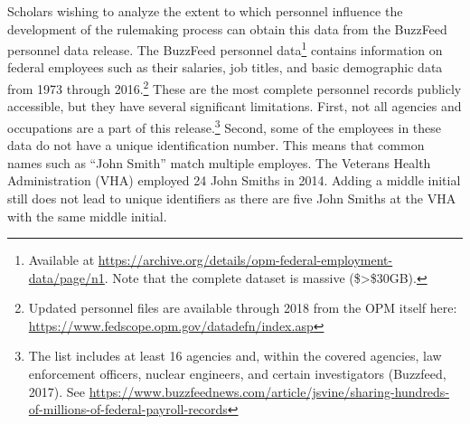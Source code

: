 \documentclass[
      12pt,
        ]{article}
\begin{document}
Scholars wishing to analyze the extent to which personnel influence the
development of the rulemaking process can obtain this data from the
BuzzFeed personnel data release. The BuzzFeed personnel data\footnote{Available
  at
  \url{https://archive.org/details/opm-federal-employment-data/page/n1}.
  Note that the complete dataset is massive (\$\textgreater\$30GB).}
contains information on federal employees such as their salaries, job
titles, and basic demographic data from 1973 through 2016.\footnote{Updated
  personnel files are available through 2018 from the OPM itself here:
  \url{https://www.fedscope.opm.gov/datadefn/index.asp}} These are the
most complete personnel records publicly accessible, but they have
several significant limitations. First, not all agencies and occupations
are a part of this release.\footnote{The list includes at least 16
  agencies and, within the covered agencies, law enforcement officers,
  nuclear engineers, and certain investigators (Buzzfeed, 2017). See
  \url{https://www.buzzfeednews.com/article/jsvine/sharing-hundreds-of-millions-of-federal-payroll-records}}
Second, some of the employees in these data do not have a unique
identification number. This means that common names such as ``John
Smith'' match multiple employes. The Veterans Health Administration
(VHA) employed 24 John Smiths in 2014. Adding a middle initial still
does not lead to unique identifiers as there are five John Smiths at the
VHA with the same middle initial.
\end{document}

